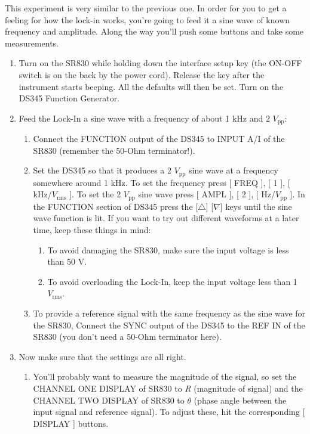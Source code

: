 \documentclass{../lab}
\begin{document}
This experiment is very similar to the previous one. In order for you to get a feeling for how the lock-in works, you're going to feed it a sine wave of known frequency and amplitude. Along the way you'll push some buttons and take some measurements.

\begin{enumerate}
    \item Turn on the SR830 while holding down the interface setup key (the ON-OFF switch is on the back by the power cord). Release the key after the instrument starts beeping. All the defaults will then be set. Turn on the DS345 Function Generator.

    \item Feed the Lock-In a sine wave with a frequency of about 1 kHz and 2 $V_\text{pp}$:
    \begin{enumerate}
        \item Connect the FUNCTION output of the DS345 to INPUT A/I of the SR830 (remember the 50-Ohm terminator!).

        \item Set the DS345 so that it produces a 2 $V_\text{pp}$ sine wave at a frequency somewhere around 1 kHz. To set the frequency press [ FREQ ], [ 1 ], [ kHz/$V_\text{rms}$ ]. To set the 2 $V_\text{pp}$ sine wave press [ AMPL ], [ 2 ], [ Hz/$V_\text{pp}$ ]. In the FUNCTION section of DS345 press the [$\triangle$] [$\nabla$] keys until the sine wave function is lit. If you want to try out different waveforms at a later time, keep these things in mind:
        \begin{enumerate}
            \item To avoid damaging the SR830, make sure the input voltage is less than 50 V.

            \item To avoid overloading the Lock-In, keep the input voltage less than 1 $V_\text{rms}$.

        \end{enumerate}

        \item To provide a reference signal with the same frequency as the sine wave for the SR830, Connect the SYNC output of the DS345 to the REF IN of the SR830 (you don't need a 50-Ohm terminator here).

    \end{enumerate}

    \item Now make sure that the settings are all right.
    \begin{enumerate}
        \item You'll probably want to measure the magnitude of the signal, so set the CHANNEL ONE DISPLAY of SR830 to \emph{R} (magnitude of signal) and the CHANNEL TWO DISPLAY of SR830 to $\theta$ (phase angle between the input signal and reference signal). To adjust these, hit the corresponding [ DISPLAY ] buttons.


\end{enumerate}
\end{enumerate}
\end{document}
